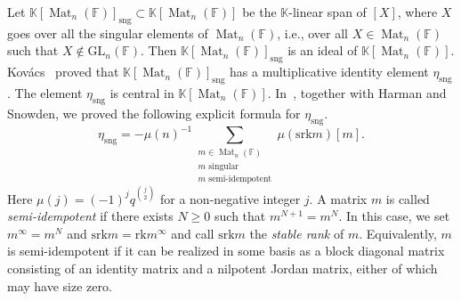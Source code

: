 \documentclass[12pt, reqno]{amsart}
\theoremstyle{definition}
\newcommand{\coefficientsField}{\mathbb{K}}
\newcommand{\GL}{\mathrm{GL}}
\newcommand{\finiteField}{\mathbb{F}}
\newcommand{\squareMatrix}{\operatorname{Mat}}
\newcommand{\rank}{\mathrm{rk}}
\newcommand{\srank}{\mathrm{srk}}
\newcommand{\Kovacs}{Kov\'acs}
\newcommand{\singular}{\mathrm{sng}}
\begin{document}
Let $\coefficientsField\left[\squareMatrix_n\left(\finiteField\right)\right]_{\singular} \subset \coefficientsField\left[\squareMatrix_n\left(\finiteField\right)\right]$ be the $\coefficientsField$-linear span of $\left[X\right]$, where $X$ goes over all the singular elements of $\squareMatrix_n\left(\finiteField\right)$, i.e., over all $X \in \squareMatrix_n\left(\finiteField\right)$ such that $X \notin \GL_n\left(\finiteField\right)$. Then $\coefficientsField\left[\squareMatrix_n\left(\finiteField\right)\right]_{\singular}$ is an ideal of $\coefficientsField\left[\squareMatrix_n\left(\finiteField\right)\right]$. \Kovacs{}~\cite{Kovacs1992} proved that $\coefficientsField\left[\squareMatrix_n\left(\finiteField\right)\right]_{\singular}$ has a multiplicative identity element $\eta_{\singular}$. The element $\eta_{\singular}$ is central in $\coefficientsField\left[\squareMatrix_n\left(\finiteField\right)\right]$. In~\cite[Theorem 4.1]{HarmanSnowdenZelingher2025}, together with Harman and Snowden, we proved the following explicit formula for $\eta_{\singular}$.
\begin{displaymath}
\eta_{\singular} = -\mu\left(n\right)^{-1} \sum_{\substack{m \in \squareMatrix_n\left(\finiteField\right) \\
m \text{ singular}\\
m \text{ semi-idempotent}}} \mu\left(\srank m\right) \left[m\right].
\end{displaymath}
Here $\mu\left(j\right) = \left(-1\right)^j q^{\binom{j}{2}}$ for a non-negative integer $j$. A matrix $m$ is called \emph{semi-idempotent} if there exists $N \ge 0$ such that $m^{N+1} = m^N$. In this case, we set $m^{\infty} = m^N$ and $\srank m = \rank m^{\infty}$ and call $\srank m$ the \emph{stable rank} of $m$. Equivalently, $m$ is semi-idempotent if it can be realized in some basis as a block diagonal matrix consisting of an identity matrix and a nilpotent Jordan matrix, either of which may have size zero.
\end{document}
